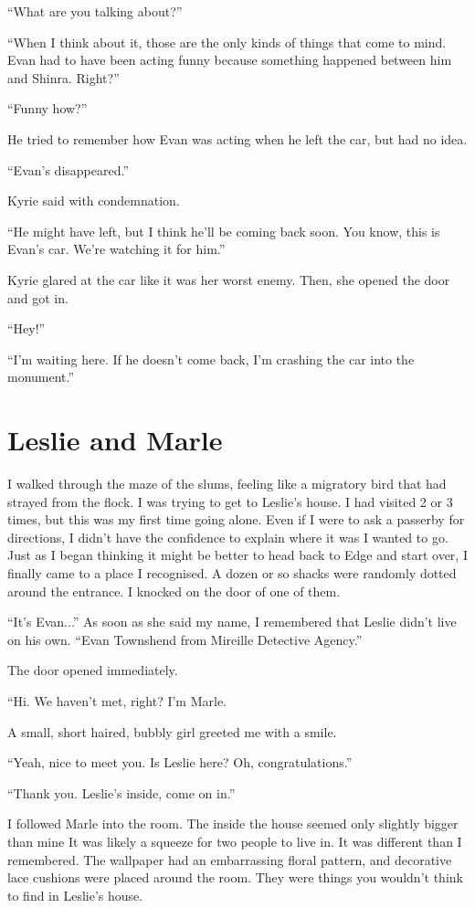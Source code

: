\documentclass[oneside]{book}
\begin{document}
“What are you talking about?”

“When I think about it, those are the only kinds of things that come to mind. Evan had to have been acting funny because something happened between him and Shinra. Right?”

“Funny how?”

He tried to remember how Evan was acting when he left the car, but had no idea.

“Evan’s disappeared.”

Kyrie said with condemnation.

“He might have left, but I think he’ll be coming back soon. You know, this is Evan’s car. We’re watching it for him.”

Kyrie glared at the car like it was her worst enemy. Then, she opened the door and got in.

“Hey!”

“I’m waiting here. If he doesn’t come back, I’m crashing the car into the monument.”

\chapter{Leslie and Marle}
I walked through the maze of the slums, feeling like a migratory bird that had strayed from the flock. I was trying to get to Leslie’s house. I had visited 2 or 3 times, but this was my first time going alone. Even if I were to ask a passerby for directions, I didn’t have the confidence to explain where it was I wanted to go. Just as I began thinking it might be better to head back to Edge and start over, I finally came to a place I recognised. A dozen or so shacks were randomly dotted around the entrance. I knocked on the door of one of them.

“It’s Evan...” As soon as she said my name, I remembered that Leslie didn’t live on his own. “Evan Townshend from Mireille Detective Agency.”

The door opened immediately.

“Hi. We haven’t met, right? I’m Marle.

A small, short haired, bubbly girl greeted me with a smile.

“Yeah, nice to meet you. Is Leslie here? Oh, congratulations.”

“Thank you. Leslie’s inside, come on in.”

I followed Marle into the room. The inside the house seemed only slightly bigger than mine It was likely a squeeze for two people to live in. It was different than I remembered. The wallpaper had an embarrassing floral pattern, and decorative lace cushions were placed around the room. They were things you wouldn’t think to find in Leslie’s house.
\end{document}
